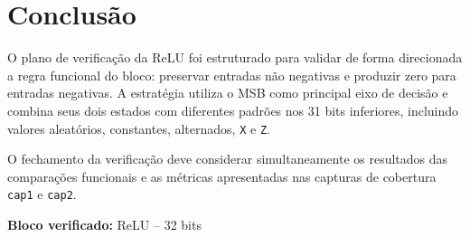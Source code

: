 \documentclass[12pt,a4paper]{article}
\begin{document}
\section{Conclusão}
O plano de verificação da ReLU foi estruturado para validar de forma direcionada a regra funcional do bloco: preservar entradas não negativas e produzir zero para entradas negativas. A estratégia utiliza o MSB como principal eixo de decisão e combina seus dois estados com diferentes padrões nos 31 bits inferiores, incluindo valores aleatórios, constantes, alternados, \texttt{X} e \texttt{Z}.

O fechamento da verificação deve considerar simultaneamente os resultados das comparações funcionais e as métricas apresentadas nas capturas de cobertura \texttt{cap1} e \texttt{cap2}.

\vfill
\begin{center}
    \textbf{Bloco verificado:} ReLU -- 32 bits
\end{center}
\end{document}
